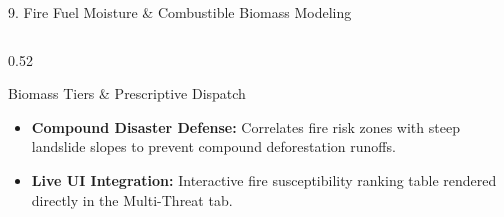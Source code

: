 \documentclass[aspectratio=169, 11pt]{beamer}
\begin{document}
\begin{frame}{9. Fire Fuel Moisture \& Combustible Biomass Modeling}
\begin{columns}[c]
\begin{column}{0.52\textwidth}
\begin{exampleblock}{Biomass Tiers \& Prescriptive Dispatch}
\begin{itemize}
\begin{itemize}
                            \item \textbf{Low ($<0.25$):} Hydrated canopy; standard passive monitoring.
                        \end{itemize}
                    \item \textbf{Compound Disaster Defense:} Correlates fire risk zones with steep landslide slopes to prevent compound deforestation runoffs.
                    \item \textbf{Live UI Integration:} Interactive fire susceptibility ranking table rendered directly in the Multi-Threat tab.
                \end{itemize}
            \end{exampleblock}
        \end{column}
    \end{columns}
\end{frame}


\end{document}
